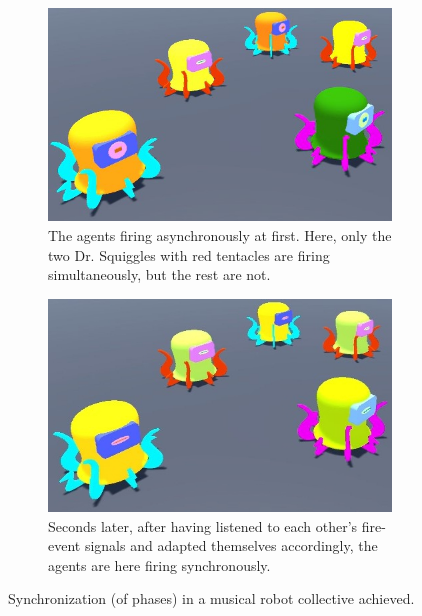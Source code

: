 \begin{figure}[h]
	\centering
		\begin{subfigure}[t]{.5\textwidth}
			\centering\captionsetup{width=.9\linewidth}%
			\includegraphics[width=0.9\linewidth]{Assets/Figures/IntroUnsynch.jpg}
			\caption{The agents firing asynchronously at first. Here, only the two Dr. Squiggles with red tentacles are firing simultaneously, but the rest are not.}
			\label{initial:unsynch}
		\end{subfigure}%
		\begin{subfigure}[t]{.5\textwidth}
			\centering\captionsetup{width=.9\linewidth}%
			\includegraphics[width=0.9\linewidth]{Assets/Figures/IntroSynch.jpg}
			\caption{Seconds later, after having listened to each other's fire-event signals and adapted themselves accordingly, the agents are here firing synchronously.}
			\label{initial:synch}
		\end{subfigure}
	\caption{Synchronization (of phases) in a musical robot collective achieved.}	%
	\label{initial:synch}
\end{figure}





